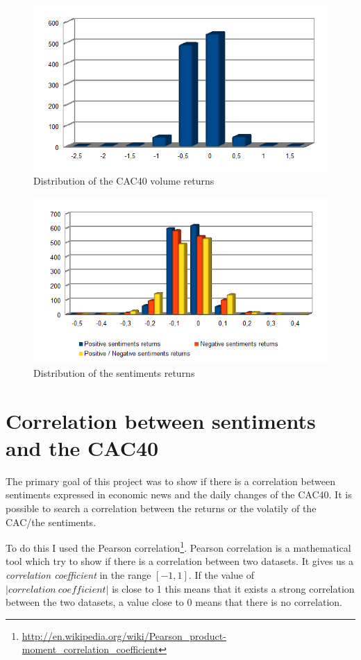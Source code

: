 \documentclass[12pt]{report}
\begin{document}
			\begin{figure}[H]
				\caption{Distribution of the CAC40 volume returns\label{dist_vol}}
				\includegraphics{plots/dists/volume_return.png}
			\end{figure}

			\begin{figure}[H]
				\caption{Distribution of the sentiments returns\label{dist_sentiments}}
				\includegraphics{plots/dists/pos_neg_posneg_returns_dist.png}
			\end{figure}

		\section{Correlation between sentiments and the CAC40}

			The primary goal of this project was to show if there is a correlation between sentiments expressed in economic news and the daily changes of the CAC40. It is possible to search a correlation between the returns or the volatily of the CAC/the sentiments.

			To do this I used the Pearson correlation\footnote{\url{http://en.wikipedia.org/wiki/Pearson_product-moment_correlation_coefficient}}. Pearson correlation is a mathematical tool which try to show if there is a correlation between two datasets. It gives us a \emph{correlation coefficient} in the range $[-1, 1]$. If the value of $|correlation\ coefficient|$ is close to 1 this means that it exists a strong correlation between the two datasets, a value close to 0 means that there is no correlation.
\end{document}
